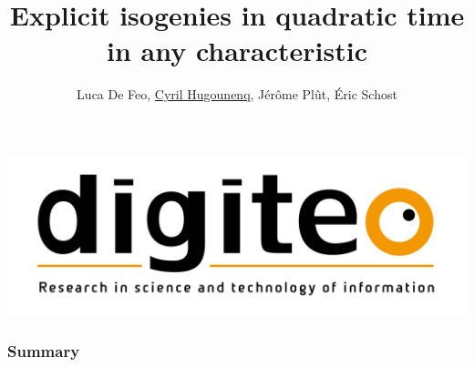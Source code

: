 \documentclass[10pt,a4paper]{beamer}
\theoremstyle{plain}
\theoremstyle{definition}
\theoremstyle{definition}
\theoremstyle{definition}
\theoremstyle{definition}
\newtheorem{defi}[thm]{Definition}
\theoremstyle{remark}
\theoremstyle{remark}
\begin{document}
\author{
 Luca De Feo, \underline{Cyril Hugounenq}, J\'er\^ome Pl\^ut, \'Eric Schost
}
\title[Explicit isogenies in quadratic time in any characteristic]{
Explicit isogenies in quadratic time in any characteristic}
\begin{frame}
\titlepage
\includegraphics[scale=0.1]{Images/digiteo.jpg} 
\end{frame}
\begin{frame}
\frametitle{Summary}
\tableofcontents
\end{frame}

% 
%
\end{document}
